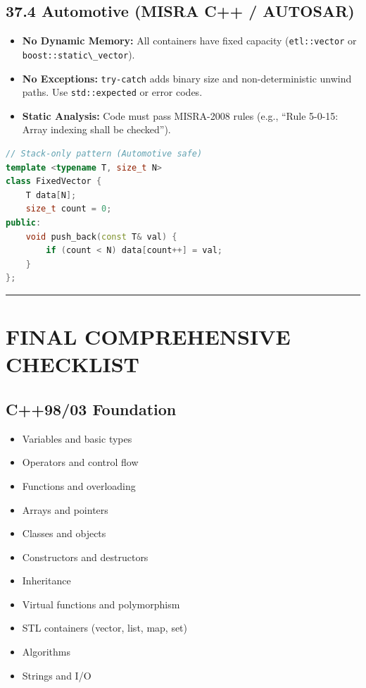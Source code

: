\hypertarget{automotive-misra-c-autosar}{%
\subsection{37.4 Automotive (MISRA C++ /
AUTOSAR)}\label{automotive-misra-c-autosar}}

\begin{itemize}
\tightlist
\item
  \textbf{No Dynamic Memory:} All containers have fixed capacity
  (\passthrough{\lstinline!etl::vector!} or
  \passthrough{\lstinline!boost::static\_vector!}).
\item
  \textbf{No Exceptions:} \passthrough{\lstinline!try-catch!} adds
  binary size and non-deterministic unwind paths. Use
  \passthrough{\lstinline!std::expected!} or error codes.
\item
  \textbf{Static Analysis:} Code must pass MISRA-2008 rules (e.g.,
  ``Rule 5-0-15: Array indexing shall be checked'').
\end{itemize}

\begin{lstlisting}[language={C++}]
// Stack-only pattern (Automotive safe)
template <typename T, size_t N>
class FixedVector {
    T data[N];
    size_t count = 0;
public:
    void push_back(const T& val) {
        if (count < N) data[count++] = val;
    }
};
\end{lstlisting}

\begin{center}\rule{0.5\linewidth}{0.5pt}\end{center}

\hypertarget{final-comprehensive-checklist}{%
\section{FINAL COMPREHENSIVE
CHECKLIST}\label{final-comprehensive-checklist}}

\hypertarget{c9803-foundation}{%
\subsection{C++98/03 Foundation}\label{c9803-foundation}}

\begin{itemize}
\tightlist
\item
  Variables and basic types
\item
  Operators and control flow
\item
  Functions and overloading
\item
  Arrays and pointers
\item
  Classes and objects
\item
  Constructors and destructors
\item
  Inheritance
\item
  Virtual functions and polymorphism
\item
  STL containers (vector, list, map, set)
\item
  Algorithms
\item
  Strings and I/O
\end{itemize}

